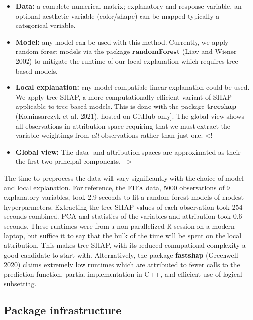 \documentclass[
]{article}
\begin{document}
\begin{itemize}
    \item \textbf{Data:} a complete numerical matrix; explanatory and response variable, an optional aesthetic variable (color/shape)  can be mapped typically a categorical variable.
    \item \textbf{Model:} any model can be used with this method. Currently, we apply random forest models via the package \textbf{randomForest} (Liaw and Wiener 2002) to mitigate the runtime of our local explanation which requires tree-based models.
    \item \textbf{Local explanation:} any model-compatible linear explanation could be used. We apply tree SHAP, a more computationally efficient variant of SHAP applicable to tree-based models. This is done with the package \textbf{treeshap} (Kominsarczyk et al. 2021), hosted on GitHub only]. The global view shows all observations in attribution space requiring that we must extract the variable weightings from \emph{all} observations rather than just one.
    <!-- \item \textbf{Global view:} The data- and attribution-spaces are approximated as their the first two principal components. -->
\end{itemize}

The time to preprocess the data will vary significantly with the choice of model and local explanation. For reference, the FIFA data, 5000 observations of 9 explanatory variables, took 2.9 seconds to fit a random forest models of modest hyperparmeters. Extracting the tree SHAP values of each observation took 254 seconds combined. PCA and statistics of the variables and attribution took 0.6 seconds. These runtimes were from a non-parallelized R session on a modern laptop, but suffice it to say that the bulk of the time will be spent on the local attribution. This makes tree SHAP, with its reduced comupational complexity a good candidate to start with. Alternatively, the package \textbf{fastshap} (Greenwell 2020) claims extremely low runtimes which are attributed to fewer calls to the prediction function, partial implementation in C++, and efficient use of logical subsetting.

\hypertarget{sec:infrastructure}{%
\subsection{Package infrastructure}\label{sec:infrastructure}}
\end{document}
